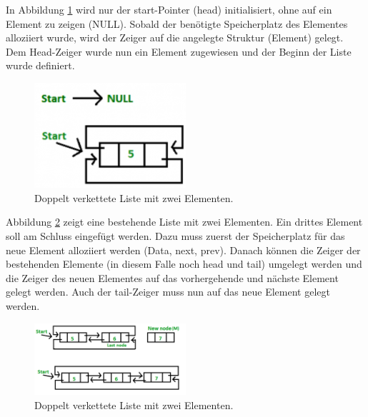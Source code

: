 In Abbildung \ref{fig:Doubly_Linked_List_2_0} wird nur der start-Pointer (head) initialisiert, ohne auf ein Element zu zeigen (NULL). Sobald der benötigte Speicherplatz des Elementes alloziiert wurde, wird der Zeiger auf die angelegte Struktur (Element) gelegt. Dem Head-Zeiger wurde nun ein Element zugewiesen und der Beginn der Liste wurde definiert.

\begin{figure}[h!]
	\centering
	\includegraphics[width=0.5\textwidth]{graphics/Doubly_Linked_List_2_0}
	\caption{Doppelt verkettete Liste mit zwei Elementen.}
	\label{fig:Doubly_Linked_List_2_0}
\end{figure}


Abbildung \ref{fig:Doubly_Linked_List_2_1} zeigt eine bestehende Liste mit zwei Elementen. Ein drittes Element soll am Schluss eingefügt werden. Dazu muss zuerst der Speicherplatz für das neue Element alloziiert werden (Data, next, prev). Danach können die Zeiger der bestehenden Elemente (in diesem Falle noch head und tail) umgelegt werden und die Zeiger des neuen Elementes auf das vorhergehende und nächste Element gelegt werden. Auch der tail-Zeiger muss nun auf das neue Element gelegt werden.

\begin{figure}[h!]
	\centering
	\includegraphics[width=0.5\textwidth]{graphics/Doubly_Linked_List_2_1}
	\caption{Doppelt verkettete Liste mit zwei Elementen.}
	\label{fig:Doubly_Linked_List_2_1}
\end{figure}



